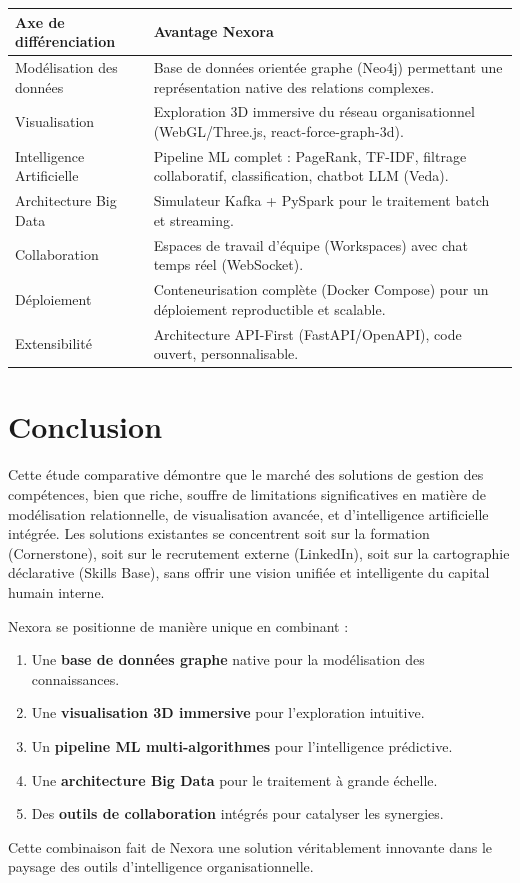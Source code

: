 \documentclass[12pt,a4paper]{article}
\begin{document}
\begin{longtable}{|p{5cm}|p{8.5cm}|}
\hline
\rowcolor{bleu!15}
\textbf{Axe de différenciation} & \textbf{Avantage Nexora} \\
\hline
Modélisation des données & Base de données orientée graphe (Neo4j) permettant une représentation native des relations complexes. \\
\hline
Visualisation & Exploration 3D immersive du réseau organisationnel (WebGL/Three.js, react-force-graph-3d). \\
\hline
Intelligence Artificielle & Pipeline ML complet : PageRank, TF-IDF, filtrage collaboratif, classification, chatbot LLM (Veda). \\
\hline
Architecture Big Data & Simulateur Kafka + PySpark pour le traitement batch et streaming. \\
\hline
Collaboration & Espaces de travail d'équipe (Workspaces) avec chat temps réel (WebSocket). \\
\hline
Déploiement & Conteneurisation complète (Docker Compose) pour un déploiement reproductible et scalable. \\
\hline
Extensibilité & Architecture API-First (FastAPI/OpenAPI), code ouvert, personnalisable. \\
\hline
\end{longtable}

\section{Conclusion}

Cette étude comparative démontre que le marché des solutions de gestion des compétences, bien que riche, souffre de limitations significatives en matière de modélisation relationnelle, de visualisation avancée, et d'intelligence artificielle intégrée. Les solutions existantes se concentrent soit sur la formation (Cornerstone), soit sur le recrutement externe (LinkedIn), soit sur la cartographie déclarative (Skills Base), sans offrir une vision unifiée et intelligente du capital humain interne.

Nexora se positionne de manière unique en combinant :
\begin{enumerate}
    \item Une \textbf{base de données graphe} native pour la modélisation des connaissances.
    \item Une \textbf{visualisation 3D immersive} pour l'exploration intuitive.
    \item Un \textbf{pipeline ML multi-algorithmes} pour l'intelligence prédictive.
    \item Une \textbf{architecture Big Data} pour le traitement à grande échelle.
    \item Des \textbf{outils de collaboration} intégrés pour catalyser les synergies.
\end{enumerate}

Cette combinaison fait de Nexora une solution véritablement innovante dans le paysage des outils d'intelligence organisationnelle.
\end{document}

